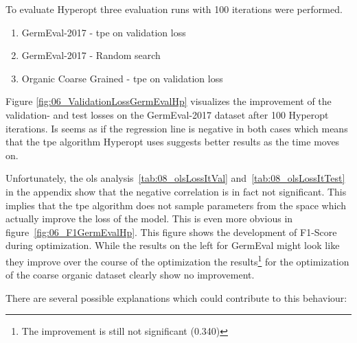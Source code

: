 To evaluate Hyperopt three evaluation runs with 100 iterations were performed.

\begin{enumerate}
	\item GermEval-2017 - \gls{tpe} on validation loss
	\item GermEval-2017 - Random search
	\item Organic Coarse Grained - \gls{tpe} on validation loss
\end{enumerate}

Figure \ref{fig:06_ValidationLossGermEvalHp} visualizes the improvement of the validation- and test losses on the GermEval-2017 dataset after 100 Hyperopt iterations. Is seems as if the regression line is negative in both cases which means that the \gls{tpe} algorithm Hyperopt uses suggests better results as the time moves on.

Unfortunately, the \gls{ols} analysis~\ref{tab:08_olsLossItVal} and~\ref{tab:08_olsLossItTest} in the appendix show that the negative correlation is in fact not significant. This implies that the \gls{tpe} algorithm does not sample parameters from the space which actually improve the loss of the model. This is even more obvious in figure~\ref{fig:06_F1GermEvalHp}. This figure shows the development of F1-Score during optimization. While the results on the left for GermEval might look like they improve over the course of the optimization the results\footnote{The improvement is still not significant {(0.340)}} for the optimization of the coarse organic dataset clearly show no improvement.
\medskip

There are several possible explanations which could contribute to this behaviour:

